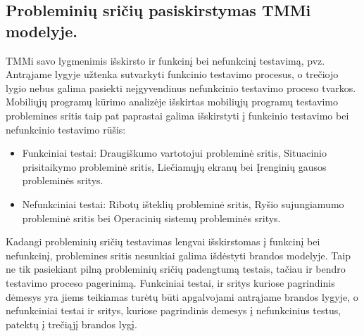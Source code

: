 \documentclass{VUMIFPSkursinis}
\begin{document}
\subsection{Probleminių sričių pasiskirstymas TMMi modelyje.}
TMMi savo lygmenimis išskirsto ir funkcinį bei nefunkcinį testavimą, pvz. Antrąjame lygyje užtenka sutvarkyti funkcinio testavimo procesus, o trečiojo lygio nebus galima pasiekti neįgyvendinus nefunkcinio testavimo proceso tvarkos. Mobiliųjų programų kūrimo analizėje išskirtas mobiliųjų programų testavimo problemines sritis taip pat paprastai galima išskirstyti į funkcinio testavimo bei nefunkcinio testavimo rūšis:
\begin{itemize}
   \item Funkciniai testai: Draugiškumo vartotojui probleminė sritis, Situacinio prisitaikymo probleminė sritis, Liečiamųjų ekranų bei Įrenginių gausos probleminės sritys.
   \item Nefunkciniai testai: Ribotų išteklių probleminė sritis, Ryšio sujungiamumo probleminė sritis bei Operacinių sistemų probleminės sritys.
\end{itemize}
Kadangi probleminių sričių testavimas lengvai išskirstomas į funkcinį bei nefunkcinį, problemines sritis nesunkiai galima išdėstyti brandos modelyje. Taip ne tik pasiekiant pilną probleminių sričių padengtumą testais, tačiau ir bendro testavimo proceso pagerinimą. Funkciniai testai, ir sritys kuriose pagrindinis dėmesys yra jiems teikiamas turėtų būti apgalvojami antrąjame brandos lygyje, o nefunkciniai testai ir sritys, kuriose pagrindinis demesys į nefunkcinius testus, patektų į trečiąjį brandos lygį.
\end{document}
